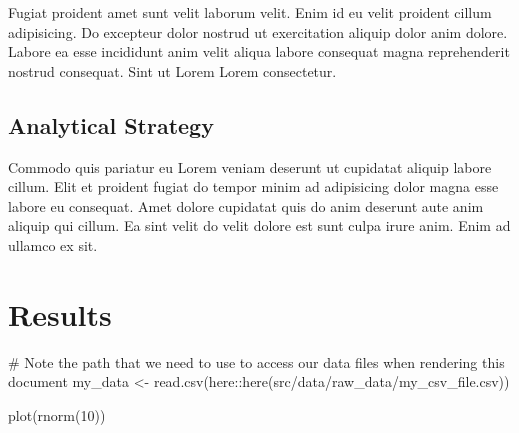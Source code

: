 \documentclass[
  super,
  preprint,
  3p]{elsarticle}
\newenvironment{Shaded}{\begin{snugshade}}{\end{snugshade}}
\newcommand{\CommentTok}[1]{\textcolor[rgb]{0.37,0.37,0.37}{#1}}
\newcommand{\DecValTok}[1]{\textcolor[rgb]{0.68,0.00,0.00}{#1}}
\newcommand{\FunctionTok}[1]{\textcolor[rgb]{0.28,0.35,0.67}{#1}}
\newcommand{\NormalTok}[1]{\textcolor[rgb]{0.00,0.23,0.31}{#1}}
\newcommand{\OtherTok}[1]{\textcolor[rgb]{0.00,0.23,0.31}{#1}}
\newcommand{\SpecialCharTok}[1]{\textcolor[rgb]{0.37,0.37,0.37}{#1}}
\newcommand{\StringTok}[1]{\textcolor[rgb]{0.13,0.47,0.30}{#1}}
\begin{document}
Fugiat proident amet sunt velit laborum velit. Enim id eu velit proident
cillum adipisicing. Do excepteur dolor nostrud ut exercitation aliquip
dolor anim dolore. Labore ea esse incididunt anim velit aliqua labore
consequat magna reprehenderit nostrud consequat. Sint ut Lorem Lorem
consectetur.

\subsection{Analytical Strategy}

Commodo quis pariatur eu Lorem veniam deserunt ut cupidatat aliquip
labore cillum. Elit et proident fugiat do tempor minim ad adipisicing
dolor magna esse labore eu consequat. Amet dolore cupidatat quis do anim
deserunt aute anim aliquip qui cillum. Ea sint velit do velit dolore est
sunt culpa irure anim. Enim ad ullamco ex sit.

\hypertarget{results-1}{%
\section{Results}\label{results-1}}

\begin{Shaded}
\begin{Highlighting}[]
\CommentTok{\# Note the path that we need to use to access our data files when rendering this document}
\NormalTok{my\_data }\OtherTok{\textless{}{-}} \FunctionTok{read.csv}\NormalTok{(here}\SpecialCharTok{::}\FunctionTok{here}\NormalTok{(}\StringTok{\textquotesingle{}src/data/raw\_data/my\_csv\_file.csv\textquotesingle{}}\NormalTok{))}
\end{Highlighting}
\end{Shaded}

\begin{Shaded}
\begin{Highlighting}[]
\FunctionTok{plot}\NormalTok{(}\FunctionTok{rnorm}\NormalTok{(}\DecValTok{10}\NormalTok{))}
\end{Highlighting}
\end{Shaded}
\end{document}
